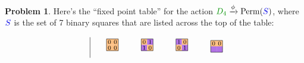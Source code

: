 \documentclass[12pt]{article}
\theoremstyle{definition} %
\newtheorem{problem}{Problem}
\begin{document}
\begin{problem}
  Here's the ``fixed point table'' for the action $\Galert{D_4} \xrightarrow{\phi} \Perm(\Balert{S})$, where $\Balert{S}$ is the set of 7 binary squares that are listed across the top of the table:
  
  \[
  \renewcommand\arraystretch{1.8}
  \begin{tabular}{c|cccccccccccccc}
    && \begin{tikzpicture}[scale=.5]
         \tikzstyle{every node}=[font=\scriptsize]
         \path[fill=actOrange] (0,.5) rectangle ++(.5,.5); 
         \path[fill=actOrange] (.5,.5) rectangle ++(.5,.5);
         \path[fill=actOrange] (0,0) rectangle ++(.5,.5);
         \path[fill=actOrange] (.5,0) rectangle ++(.5,.5);
         \draw (.25,.75) node{$0$};\draw(.75,.75)node{$0$};
         \draw (.25,.25) node{$0$};\draw(.75,.25)node{$0$};
         \draw (0,0) rectangle (1,1); 
       \end{tikzpicture}
    && 
    \begin{tikzpicture}[scale=.5]
      \tikzstyle{every node}=[font=\scriptsize]
      \path[fill=actOrange] (0,.5) rectangle ++(.5,.5); 
      \path[fill=actPurple] (.5,.5) rectangle ++(.5,.5);
      \path[fill=actPurple] (0,0) rectangle ++(.5,.5);
      \path[fill=actOrange] (.5,0) rectangle ++(.5,.5);
      \draw (0,0) rectangle (1,1);
      \draw(.25,.75) node{$0$};\draw(.75,.75)node{$1$};
      \draw(.25,.25) node{$1$};\draw (.75,.25)node{$0$};
    \end{tikzpicture}
    &&
    \begin{tikzpicture}[scale=.5]
      \tikzstyle{every node}=[font=\scriptsize]
      \path[fill=actPurple] (3.5,.5) rectangle ++(.5,.5); 
      \path[fill=actOrange] (4,.5) rectangle ++(.5,.5);
      \path[fill=actOrange] (3.5,0) rectangle ++(.5,.5);
      \path[fill=actPurple] (4,0) rectangle ++(.5,.5);
      \draw (3.5,0) rectangle (4.5,1);
      \draw(3.75,.75) node{$1$};\draw(4.25,.75)node{$0$};
      \draw(3.75,.25) node{$0$};\draw (4.25,.25)node{$1$};
    \end{tikzpicture}
    &&
    \begin{tikzpicture}[scale=.5]
      \tikzstyle{every node}=[font=\scriptsize]
      \path[fill=actOrange] (0,.5) rectangle ++(.5,.5); 
      \path[fill=actOrange] (.5,.5) rectangle ++(.5,.5);
      \path[fill=actPurple] (0,0) rectangle ++(.5,.5);
      \path[fill=actPurple] (.5,0) rectangle ++(.5,.5);
      \draw (0,0) rectangle (1,1);
      \draw (.25,.75) node{$0$}; \draw (.75,.75) node{$0$};

\end{tikzpicture}
\end{tabular}\]
\end{problem}
\end{document}
